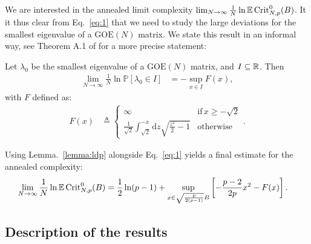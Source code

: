 \documentclass[amsmath,amssymb,nofootinbib,prd]{article}
\begin{document}
		
	We are interested in the annealed limit complexity	$\lim_{N \to \infty} \frac{1}{N} \ln \mathbb{E} \, \mathrm{Crit}_{N,p}^0(B)$. It it thus clear from Eq.~\ref{eq:1} that we need to study the large deviations for the smallest eigenvalue of a $\mathrm{GOE}(N)$ matrix. We state this result in an informal way, see Theorem A.1 of \cite{auffinger2013random} for a more precise statement:
\begin{lemma}[Informal]\label{lemma:ldp}
Let $\lambda_0$ be the smallest eigenvalue of a $\mathrm{GOE}(N)$ matrix, and $I \subseteq \mathbb{R}$. Then
\begin{align}
\lim_{N \to \infty} \frac{1}{N} \ln \mathbb{P}\left[\lambda_0 \in I\right] &= - \sup_{x \in I} F(x),
\end{align}
with $F$ defined as:
\begin{align}
F(x) &\triangleq \begin{cases} \infty &\mathrm{if}\,x \geq -\sqrt{2}  \\
 \frac{1}{\sqrt{2}} \int_{\sqrt{2}}^{-x} \mathrm{d}z\sqrt{\frac{z^2}{2} -1} & \mathrm{otherwise}
\end{cases}.
\end{align}
\end{lemma}
Using Lemma.~\ref{lemma:ldp} alongside Eq.~\ref{eq:1} yields a final estimate for the annealed complexity:
\begin{align}\label{eq:2}
\lim_{N \to \infty} \frac{1}{N} \ln \mathbb{E} \, \mathrm{Crit}_{N,p}^0(B) &= \frac{1}{2} \ln (p-1) + \sup_{x \in \sqrt{\frac{p}{2(p-1)}} B} \left[-\frac{p-2}{2p}x^2 - F(x)\right].
\end{align}
	
	\subsection{Description of the results}\label{subsec:summary}
	
\end{document}

